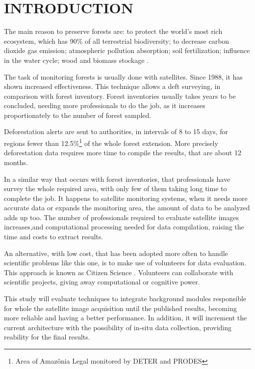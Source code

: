 \chapter{INTRODUCTION}
The main reason to preserve forests are: to protect the world's most rich ecosystem, which has 90\% of all terrestrial biodiversity; to decrease carbon dioxide gas emission; atmospheric pollution absorption; soil fertilization; influence in the water cycle; wood and biomass stockage \cite{Brooks2006, Gullison2007, Barlow2004}.

The task of monitoring forests is usually done with satellites. Since 1988, it has shown increased effectiveness\cite{Douglas2010a, Santilli2005, Monteiro2008}. This technique allows a deft surveying, in comparison with forest inventory. Forest inventories usually takes years to be concluded, needing more professionals to do the job, as it increases proportionately to the number of forest sampled.

Deforestation alerts are sent to authorities, in intervals of 8 to 15 days, for regions fewer than 12.5\%\footnote{Area of Amazônia Legal monitored by DETER and PRODES} of the whole forest extension. More precisely deforestation data requires more time to compile the results, that are about 12 months.

In a similar way that occurs with forest inventories, that professionals have survey the whole required area, with only few of them taking long time to complete the job. It happens to satellite monitoring systems, when it needs more accurate data or expands the monitoring area, the amount of data to be analyzed adds up too. The number of professionals required to evaluate satellite images increases,and computational processing needed for data compilation, raising the time and costs to extract results.

An alternative, with low cost, that has been adopted more often to handle scientific problems like this one, is to make use of volunteers for data evaluation. This approach is known as Citizen Science \cite{Irwin1995}. Volunteers can collaborate with scientific projects, giving away computational or cognitive power.

This study will evaluate techniques to integrate background modules responsible for whole the satellite image acquisition until the published results, becoming more reliable and having a better performance. In addition, it will increment the current architecture with the possibility of in-situ data collection, providing reability for the final results.

